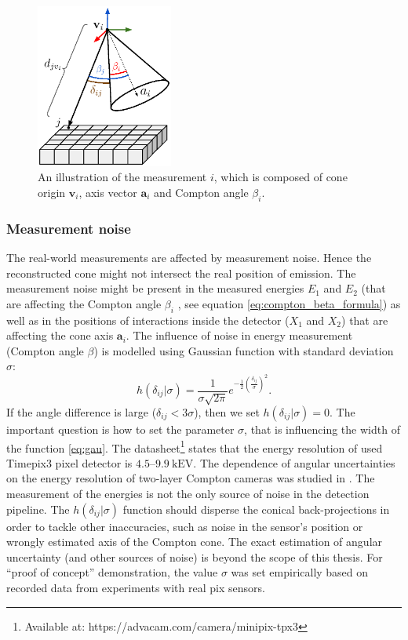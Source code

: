 \begin{figure}[!h]
  \centering
    \includegraphics[width=0.4\textwidth]{./fig/photos/cone_error_ver2.eps}
    \caption{An illustration of the measurement $i$, which is composed of cone origin $\mathbf{v}_{i}$, axis vector $\mathbf{a}_{i}$ and Compton angle $\beta_{i}$.}
    \label{fig:system_comp}
\end{figure}
\subsubsection{Measurement noise}
The real-world measurements are affected by measurement noise. Hence the reconstructed cone might not intersect the real position of emission.
The measurement noise might be present in the measured energies $E_{1}$ and $E_{2}$ (that are affecting the Compton angle $\beta_{i}$ , see equation \ref{eq:compton_beta_formula}) 
as well as in the positions of interactions inside the detector ($X_{1}$ and $X_{2}$) 
that are affecting the cone axis $\mathbf{a}_{i}$.
The influence of noise in energy measurement (Compton angle $\beta$) is modelled using Gaussian function with standard deviation $\sigma$:
\begin{equation}
  h(\delta_{ij}|\sigma) = \frac{1}{\sigma\sqrt{2\pi}}e^{-\frac{1}{2}(\frac{\delta_{ij}}{\sigma})^{2}}.
  \label{eq:gau}
\end{equation}
If the angle difference is large ($\delta_{ij}<3\sigma$), then we set $h(\delta_{ij}|\sigma) = 0$.
The important question is how to set the parameter $\sigma$, that is influencing the width of the function \ref{eq:gau}.
The datasheet\footnote{Available at: https://advacam.com/camera/minipix-tpx3}
states that the energy resolution of used Timepix3 pixel detector is $4.5$--$9.9\ \mathrm{kEV}$. 
The dependence of angular uncertainties on the energy resolution of two-layer Compton cameras was studied in \cite{ordonez}.
The measurement of the energies is not the only source of noise in the detection pipeline.
The $h(\delta_{ij}|\sigma)$ function should disperse the conical back-projections in order to tackle other inaccuracies, such as noise in the sensor's position or wrongly estimated axis of the Compton cone. 
The exact estimation of angular uncertainty (and other sources of noise) is beyond the scope of this thesis.
For ``proof of concept'' demonstration, the value $\sigma$ was set empirically based on recorded data from experiments with real \ac{pix} sensors.

